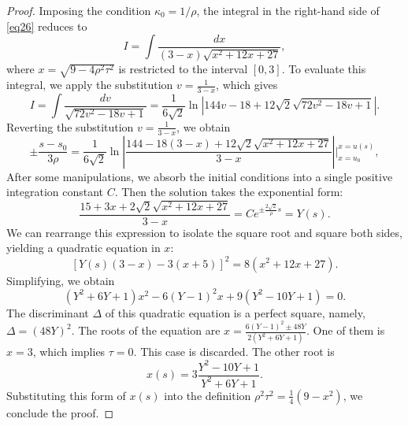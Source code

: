 \documentclass[10pt,a4paper]{amsart}
\begin{document}
\begin{proof}
Imposing the condition $\kappa_0 = 1/\rho$,   the integral in the right-hand side of \eqref{eq26} reduces to
\begin{equation*}
    I = \int \frac{dx}{(3-x)\sqrt{x^2 + 12x + 27}},
\end{equation*}
where $x=\sqrt{9-4\rho^2\tau^2}$ is restricted to the interval $[0,3]$. 
To evaluate this integral, we apply the   substitution $v = \frac{1}{3-x}$, which gives 
\begin{equation*}
    I = \int \frac{dv}{\sqrt{72v^2 - 18v + 1}} = \frac{1}{6\sqrt{2}} \ln \left| 144v - 18 + 12\sqrt{2}\sqrt{72v^2 - 18v + 1} \right|.
\end{equation*}
Reverting the substitution $v = \frac{1}{3-x}$, we obtain 
\begin{equation*}
    \pm \frac{s - s_0}{3\rho} = \frac{1}{6\sqrt{2}} \ln \left| \frac{144 - 18(3-x) + 12\sqrt{2}\sqrt{x^2+12x+27}}{3-x} \right| \Bigg|_{x=u_0}^{x=u(s)},
\end{equation*}
After some manipulations, we absorb the initial conditions into a single positive integration constant $C$. Then the 
solution takes the exponential form:
\begin{equation*}
       \frac{15 + 3x + 2\sqrt{2}\sqrt{x^2+12x+27}}{3-x}=C e^{\pm \frac{2\sqrt{2}}{\rho} s}=Y(s).
\end{equation*}
We can rearrange this expression to isolate the square root and square both sides, yielding a quadratic equation in $x$:
\begin{equation*}
    \left[ Y(s)(3-x) - 3(x+5) \right]^2 = 8(x^2 + 12x + 27).
\end{equation*} 
Simplifying, we obtain
\begin{equation*}
    (Y^2 + 6Y + 1)x^2 - 6(Y-1)^2 x + 9(Y^2 - 10Y + 1) = 0.
\end{equation*}
The discriminant $\Delta$ of this quadratic equation is  a perfect square, namely, $\Delta= (48Y)^2$. The roots of the equation are   $x = \frac{6(Y-1)^2 \pm 48Y}{2(Y^2 + 6Y + 1)}$. One of them is   $x = 3$,  which implies $\tau = 0$. This case is discarded. The other root is  
\begin{equation*}
    x(s) = 3 \frac{Y^2 - 10Y + 1}{Y^2 + 6Y + 1}.
\end{equation*}
Substituting this   form of $x(s)$ into the definition $\rho^2\tau^2 = \frac{1}{4}(9 - x^2)$, we conclude the proof.
\end{proof}
\end{document}
